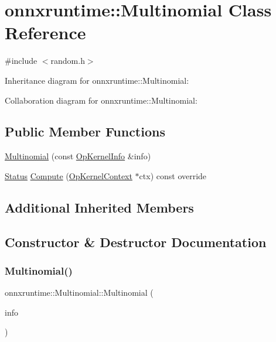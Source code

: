 \hypertarget{classonnxruntime_1_1Multinomial}{}\section{onnxruntime\+:\+:Multinomial Class Reference}
\label{classonnxruntime_1_1Multinomial}


{\ttfamily \#include $<$random.\+h$>$}



Inheritance diagram for onnxruntime\+:\+:Multinomial\+:


Collaboration diagram for onnxruntime\+:\+:Multinomial\+:
\subsection*{Public Member Functions}
\begin{DoxyCompactItemize}
\item 
\mbox{\hyperlink{classonnxruntime_1_1Multinomial_a9bc9cc4f54eccbd17df50505e57aca56}{Multinomial}} (const \mbox{\hyperlink{classonnxruntime_1_1OpKernelInfo}{Op\+Kernel\+Info}} \&info)
\item 
\mbox{\hyperlink{classonnxruntime_1_1common_1_1Status}{Status}} \mbox{\hyperlink{classonnxruntime_1_1Multinomial_a796ae88bddd1fa36e07794f18319155b}{Compute}} (\mbox{\hyperlink{classonnxruntime_1_1OpKernelContext}{Op\+Kernel\+Context}} $\ast$ctx) const override
\end{DoxyCompactItemize}
\subsection*{Additional Inherited Members}


\subsection{Constructor \& Destructor Documentation}
\mbox{\label{classonnxruntime_1_1Multinomial_a9bc9cc4f54eccbd17df50505e57aca56}} 
\subsubsection{\texorpdfstring{Multinomial()}{Multinomial()}}
{\footnotesize\ttfamily onnxruntime\+::\+Multinomial\+::\+Multinomial (\begin{DoxyParamCaption}\item[{const \mbox{\hyperlink{classonnxruntime_1_1OpKernelInfo}{Op\+Kernel\+Info}} \&}]{info }\end{DoxyParamCaption})\hspace{0.3cm}{\ttfamily [inline]}}




